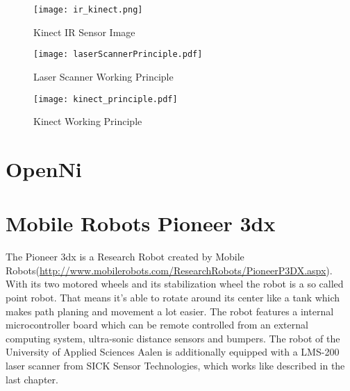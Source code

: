 \begin{figure}[h]
	\centering
	\texttt{[image: ir\_kinect.png]}
	\caption{Kinect IR Sensor Image}
	\label{figure:kinect_ir}
\end{figure}

\begin{figure}[h]
	\centering
	\texttt{[image: laserScannerPrinciple.pdf]}
	\caption{Laser Scanner Working Principle}
	\label{figure:ls_WP}
\end{figure}


\begin{figure}[h]
	\centering
	\texttt{[image: kinect\_principle.pdf]}
	\caption{Kinect Working Principle}
	\label{figure:kinect_WP} 
\end{figure}
\clearpage

\section{OpenNi}



\section{Mobile Robots Pioneer 3dx}
The Pioneer 3dx is a Research Robot created by Mobile Robots(\url{http://www.mobilerobots.com/ResearchRobots/PioneerP3DX.aspx}).
With its two motored wheels and its stabilization wheel the robot is a so called point robot. That means it's able to 
rotate around its center like a tank which makes path planing and movement a lot easier. 
The robot features a internal microcontroller board which can be remote controlled from an external computing system, 
ultra-sonic distance sensors and bumpers. The robot of the University of Applied Sciences Aalen 
is additionally equipped with a LMS-200 laser scanner from SICK Sensor Technologies, which works
like described in the last chapter.







 

 
